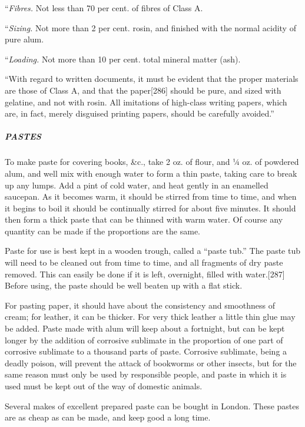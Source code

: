 \documentclass[
]{article}
\begin{document}
``\emph{Fibres.} Not less than 70 per cent. of fibres of Class A.

``\emph{Sizing.} Not more than 2 per cent. rosin, and finished with the
normal acidity of pure alum.

``\emph{Loading.} Not more than 10 per cent. total mineral matter (ash).

``With regard to written documents, it must be evident that the proper
materials are those of Class A, and that the
paper{\protect\hypertarget{Page_286}{}{{[}286{]}}} should be pure, and
sized with gelatine, and not with rosin. All imitations of high-class
writing papers, which are, in fact, merely disguised printing papers,
should be carefully avoided.''

\hypertarget{pastes}{%
\subparagraph{PASTES}\label{pastes}}

To make paste for covering books, \&c., take 2 oz. of flour, and ¼ oz.
of powdered alum, and well mix with enough water to form a thin paste,
taking care to break up any lumps. Add a pint of cold water, and heat
gently in an enamelled saucepan. As it becomes warm, it should be
stirred from time to time, and when it begins to boil it should be
continually stirred for about five minutes. It should then form a thick
paste that can be thinned with warm water. Of course any quantity can be
made if the proportions are the same.

Paste for use is best kept in a wooden trough, called a ``paste tub.''
The paste tub will need to be cleaned out from time to time, and all
fragments of dry paste removed. This can easily be done if it is left,
overnight, filled with
water.{\protect\hypertarget{Page_287}{}{{[}287{]}}} Before using, the
paste should be well beaten up with a flat stick.

For pasting paper, it should have about the consistency and smoothness
of cream; for leather, it can be thicker. For very thick leather a
little thin glue may be added. Paste made with alum will keep about a
fortnight, but can be kept longer by the addition of corrosive sublimate
in the proportion of one part of corrosive sublimate to a thousand parts
of paste. Corrosive sublimate, being a deadly poison, will prevent the
attack of bookworms or other insects, but for the same reason must only
be used by responsible people, and paste in which it is used must be
kept out of the way of domestic animals.

Several makes of excellent prepared paste can be bought in London. These
pastes are as cheap as can be made, and keep good a long time.
\end{document}
